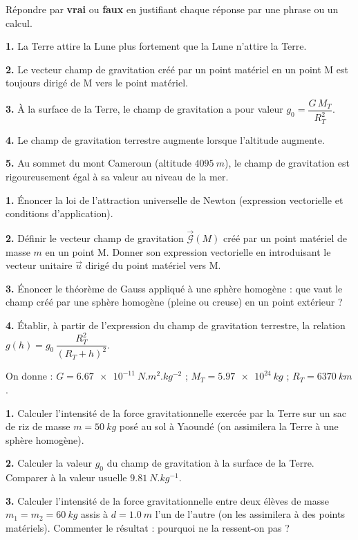 \documentclass[11pt]{article}
\begin{document}
\begin{exercice}
Répondre par \textbf{vrai} ou \textbf{faux} en justifiant chaque réponse par une phrase ou un calcul.

\textbf{1.} La Terre attire la Lune plus fortement que la Lune n'attire la Terre.

\textbf{2.} Le vecteur champ de gravitation créé par un point matériel en un point M est toujours dirigé de M vers le point matériel.

\textbf{3.} À la surface de la Terre, le champ de gravitation a pour valeur $g_0 = \dfrac{G\,M_T}{R_T^2}$.

\textbf{4.} Le champ de gravitation terrestre augmente lorsque l'altitude augmente.

\textbf{5.} Au sommet du mont Cameroun (altitude $\SI{4095}{m}$), le champ de gravitation est rigoureusement égal à sa valeur au niveau de la mer.
\end{exercice}

\begin{exercice}
\textbf{1.} Énoncer la loi de l'attraction universelle de Newton (expression vectorielle et conditions d'application).

\textbf{2.} Définir le vecteur champ de gravitation $\vec{\mathcal{G}}(M)$ créé par un point matériel de masse $m$ en un point M. Donner son expression vectorielle en introduisant le vecteur unitaire $\vec{u}$ dirigé du point matériel vers M.

\textbf{3.} Énoncer le théorème de Gauss appliqué à une sphère homogène : que vaut le champ créé par une sphère homogène (pleine ou creuse) en un point extérieur ?

\textbf{4.} Établir, à partir de l'expression du champ de gravitation terrestre, la relation $g(h) = g_0\,\dfrac{R_T^2}{(R_T + h)^2}$.
\end{exercice}

\begin{exercice}
On donne : $G = \SI{6,67e-11}{N.m^2.kg^{-2}}$ ; $M_T = \SI{5,97e24}{kg}$ ; $R_T = \SI{6370}{km}$.

\textbf{1.} Calculer l'intensité de la force gravitationnelle exercée par la Terre sur un sac de riz de masse $m = \SI{50}{kg}$ posé au sol à Yaoundé (on assimilera la Terre à une sphère homogène).

\textbf{2.} Calculer la valeur $g_0$ du champ de gravitation à la surface de la Terre. Comparer à la valeur usuelle $\SI{9,81}{N.kg^{-1}}$.

\textbf{3.} Calculer l'intensité de la force gravitationnelle entre deux élèves de masse $m_1 = m_2 = \SI{60}{kg}$ assis à $d = \SI{1,0}{m}$ l'un de l'autre (on les assimilera à des points matériels). Commenter le résultat : pourquoi ne la ressent-on pas ?
\end{exercice}
\end{document}
